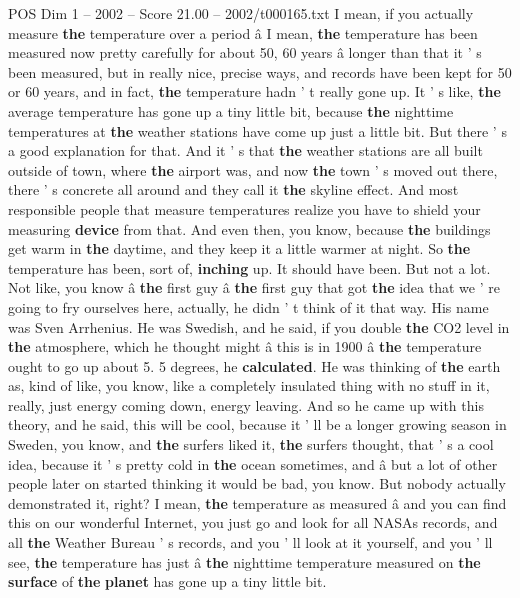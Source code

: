 \begin{textsample}{POS Dim 1 – 2002 – Score 21.00 – 2002/t000165.txt}
I mean, if you actually measure \textbf{the} temperature over a period â I mean, \textbf{the} temperature has been measured now pretty carefully for about 50, 60 years â longer than that it ' s been measured, but in really nice, precise ways, and records have been kept for 50 or 60 years, and in fact, \textbf{the} temperature hadn ' t really gone up.
It ' s like, \textbf{the} average temperature has gone up a tiny little bit, because \textbf{the} nighttime temperatures at \textbf{the} weather stations have come up just a little bit.
But there ' s a good explanation for that.
And it ' s that \textbf{the} weather stations are all built outside of town, where \textbf{the} airport was, and now \textbf{the} town ' s moved out there, there ' s concrete all around and they call it \textbf{the} skyline effect.
And most responsible people that measure temperatures realize you have to shield your measuring \textbf{device} from that.
And even then, you know, because \textbf{the} buildings get warm in \textbf{the} daytime, and they keep it a little warmer at night.
So \textbf{the} temperature has been, sort of, \textbf{inching} up.
It should have been.
But not a lot.
Not like, you know â \textbf{the} first guy â \textbf{the} first guy that got \textbf{the} idea that we ' re going to fry ourselves here, actually, he didn ' t think of it that way.
His name was Sven Arrhenius.
He was Swedish, and he said, if you double \textbf{the} CO2 level in \textbf{the} atmosphere, which he thought might â this is in 1900 â \textbf{the} temperature ought to go up about 5. 5 degrees, he \textbf{calculated}.
He was thinking of \textbf{the} earth as, kind of like, you know, like a completely insulated thing with no stuff in it, really, just energy coming down, energy leaving.
And so he came up with this theory, and he said, this will be cool, because it ' ll be a longer growing season in Sweden, you know, and \textbf{the} surfers liked it, \textbf{the} surfers thought, that ' s a cool idea, because it ' s pretty cold in \textbf{the} ocean sometimes, and â but a lot of other people later on started thinking it would be bad, you know.
But nobody actually demonstrated it, right?
I mean, \textbf{the} temperature as measured â and you can find this on our wonderful Internet, you just go and look for all NASAs records, and all \textbf{the} Weather Bureau ' s records, and you ' ll look at it yourself, and you ' ll see, \textbf{the} temperature has just â \textbf{the} nighttime temperature measured on \textbf{the} \textbf{surface} of \textbf{the} \textbf{planet} has gone up a tiny little bit.

\end{textsample}
